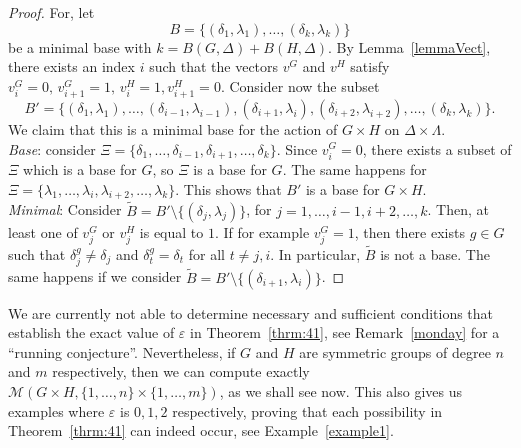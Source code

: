 \documentclass{amsart}
\begin{document}
\begin{proof}
For, let 
		\[
				B = \{(\delta_1,\lambda_1),\dots,(\delta_k,\lambda_k)\}
		\]
		be a minimal base with $k= B(G,\Delta) + B(H,\Delta)$. By Lemma~\ref{lemmaVect}, there exists an index $i$ such that the vectors $v^G$ and $v^H$ satisfy $v^G_i =0,\, v^G_{i+1} = 1,\, v^H_i=1, v^H_{i+1} = 0$. Consider now the subset
		\[
				B' = \{(\delta_1,\lambda_1),\dots,(\delta_{i-1},\lambda_{i-1}),(\delta_{i+1},\lambda_{i}),(\delta_{i+2},\lambda_{i+2}),\dots,(\delta_k,\lambda_k)\}.
		\]
		We claim that this is a minimal base for the action of $G\times H$ on $\Delta\times \Lambda$. \\
		\textit{Base}: consider $\Xi = \{\delta_1,\dots, \delta_{i-1},\delta_{i+1},\dots,\delta_k\}$. Since $v^G_i = 0$, there exists a subset of $\Xi$ which is a base for $G$, so $\Xi$ is a base for $G$. The same happens for $\Xi = \{\lambda_1,\dots,\lambda_i,\lambda_{i+2},\dots,\lambda_k\}$. This shows that $B'$ is a base for $G\times H$.
		\\
		\textit{Minimal}: Consider $\tilde{B} = B' \setminus \{(\delta_j,\lambda_j)\}$, for $j=1,\dots,i-1,i+2,\dots,k$. Then, at least one of $v^G_j$ or $v^H_j$ is equal to $1$. If for example $v^G_j = 1$, then there exists $g \in G$  such that $\delta_j^g \neq \delta_j$ and $\delta_t^g = \delta_t$ for all $t \neq j,i$. In particular, $\tilde{B}$ is not a base. The same happens if we consider $\tilde{B} = B' \setminus \{(\delta_{i+1},\lambda_i)\}$.
	\end{proof}
	
	We are currently not able to determine necessary and sufficient conditions that establish the exact value of $\varepsilon$ in Theorem~\ref{thrm:41}, see Remark~\ref{monday} for a ``running conjecture''.
	Nevertheless, if $G$ and $H$ are symmetric groups of degree $n$ and $m$ respectively, then we can compute exactly $\mathcal{M}(G \times H,\{1,\dots,n\} \times \{1,\dots,m\})$, as we shall see now. This also gives us examples where $\varepsilon$ is $0,1,2$ respectively, proving that each possibility in Theorem~\ref{thrm:41} can indeed occur, see Example~\ref{example1}.
	
\end{document}
